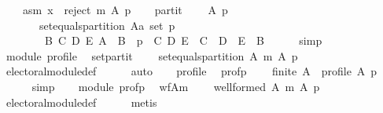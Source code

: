 \begin{isabellebody}
\ \ \ \ asm{}{\isacharcolon}{\kern0pt}\ {\isachardoublequoteopen}x\ {\isasymin}\ reject\ m\ A\ p{\isachardoublequoteclose}\isanewline
\ \ \isamarkupfalse%
\ partit{\isacharcolon}{\kern0pt}\isanewline
\ \ \ \ {\isachardoublequoteopen}{\isasymforall}A\ p{\isachardot}{\kern0pt}\isanewline
\ \ \ \ \ \ {\isasymnot}\ set{\isacharunderscore}{\kern0pt}equals{\isacharunderscore}{\kern0pt}partition\ {\isacharparenleft}{\kern0pt}A{\isacharcolon}{\kern0pt}{\isacharcolon}{\kern0pt}{\isacharprime}{\kern0pt}a\ set{\isacharparenright}{\kern0pt}\ p\ {\isasymor}\isanewline
\ \ \ \ \ \ \ \ {\isacharparenleft}{\kern0pt}{\isasymexists}B\ C\ D\ E{\isachardot}{\kern0pt}\ A\ {\isacharequal}{\kern0pt}\ B\ {\isasymand}\ p\ {\isacharequal}{\kern0pt}\ {\isacharparenleft}{\kern0pt}C{\isacharcomma}{\kern0pt}\ D{\isacharcomma}{\kern0pt}\ E{\isacharparenright}{\kern0pt}\ {\isasymand}\ C\ {\isasymunion}\ D\ {\isasymunion}\ E\ {\isacharequal}{\kern0pt}\ B{\isacharparenright}{\kern0pt}{\isachardoublequoteclose}\isanewline
\ \ \ \ \isamarkupfalse%
\ simp\isanewline
\ \ \isamarkupfalse%
\ module\ profile\ \isamarkupfalse%
\ set{\isacharunderscore}{\kern0pt}partit{\isacharcolon}{\kern0pt}\isanewline
\ \ \ \ {\isachardoublequoteopen}set{\isacharunderscore}{\kern0pt}equals{\isacharunderscore}{\kern0pt}partition\ A\ {\isacharparenleft}{\kern0pt}m\ A\ p{\isacharparenright}{\kern0pt}{\isachardoublequoteclose}\isanewline
\ \ \ \ \isamarkupfalse%
\ electoral{\isacharunderscore}{\kern0pt}module{\isacharunderscore}{\kern0pt}def\isanewline
\ \ \ \ \isamarkupfalse%
\ auto\isanewline
\ \ \isamarkupfalse%
\ profile\ \isamarkupfalse%
\ prof{\isacharunderscore}{\kern0pt}p{\isacharcolon}{\kern0pt}\isanewline
\ \ \ \ {\isachardoublequoteopen}finite\ A\ {\isasymand}\ profile\ A\ p{\isachardoublequoteclose}\isanewline
\ \ \ \ \isamarkupfalse%
\ simp\isanewline
\ \ \isamarkupfalse%
\ module\ prof{\isacharunderscore}{\kern0pt}p\ \isamarkupfalse%
\ wf{\isacharunderscore}{\kern0pt}A{\isacharunderscore}{\kern0pt}m{\isacharcolon}{\kern0pt}\isanewline
\ \ \ \ {\isachardoublequoteopen}well{\isacharunderscore}{\kern0pt}formed\ A\ {\isacharparenleft}{\kern0pt}m\ A\ p{\isacharparenright}{\kern0pt}{\isachardoublequoteclose}\isanewline
\ \ \ \ \isamarkupfalse%
\ electoral{\isacharunderscore}{\kern0pt}module{\isacharunderscore}{\kern0pt}def\isanewline
\ \ \ \ \isamarkupfalse%
\ metis\isanewline
\ \ \isamarkupfalse%

\end{isabellebody}
